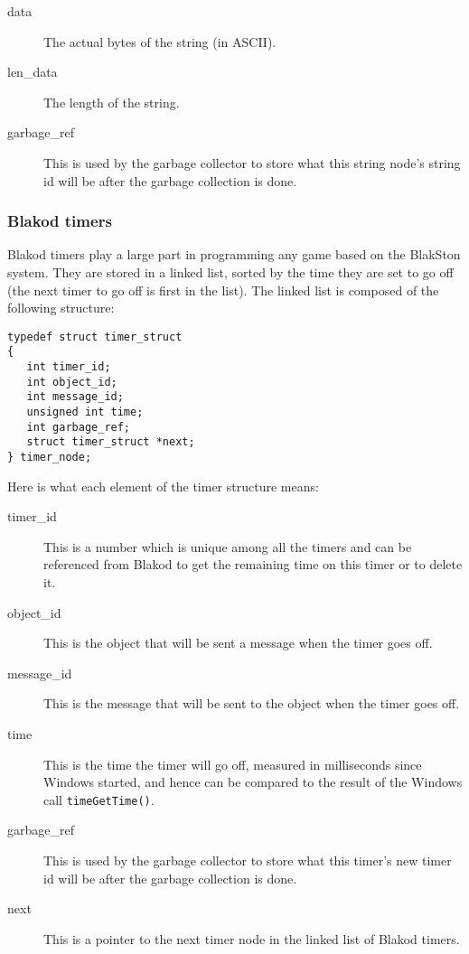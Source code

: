 \begin{description}
\item[data] The actual bytes of the string (in ASCII).
\item[len\_data] The length of the string.
\item[garbage\_ref] This is used by the garbage collector to store what
this string node's string id will be after the garbage collection is done.
\end{description}

\subsubsection{Blakod timers}

Blakod timers play a large part in programming any game based on the BlakSton system.
They are stored in a linked list, sorted by the time they are set to go off (the next
timer to go off is first in the list).  The linked list is composed of the following
structure:
\begin{verbatim}
typedef struct timer_struct
{
   int timer_id;
   int object_id;
   int message_id;
   unsigned int time;
   int garbage_ref;
   struct timer_struct *next;
} timer_node;
\end{verbatim}

Here is what each element of the timer structure means:

\begin{description}
\item[timer\_id] This is a number which is unique among all the timers and can be 
referenced from Blakod to get the remaining time on this timer or to delete it.

\item[object\_id] This is the object that will be sent a message when the timer goes off.

\item[message\_id] This is the message that will be sent to the object when the timer
goes off.

\item[time] This is the time the timer will go off, measured in milliseconds since
Windows started, and hence can be compared to the result of the Windows call
\texttt{timeGetTime()}.

\item[garbage\_ref] This is used by the garbage collector to store what this timer's
new timer id will be after the garbage collection is done.

\item[next] This is a pointer to the next timer node in the linked list of Blakod timers.
\end{description}

